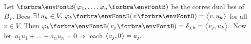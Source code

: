 
Let $\Par{\varphi_1,\dots,\varphi_n}$ be the corres dual bss of $B_V.$ \;Becs $\exists\,!\,u_k\in V,\,\varphi_k\Par{v}=\Ang{v,u_k}$ for all $v\in V.$\parSol{}
Then $\varphi_k\Par{v_j}=\delta_{j,k}=\Ang{v_j,u_k}.$ \;Now let \,$a_1u_1+\dots+a_nu_n=0\Rightarrow$ each $\big\langle{}v_j,0{}\big\rangle=a_j.$\PfEnd
\SepLine

